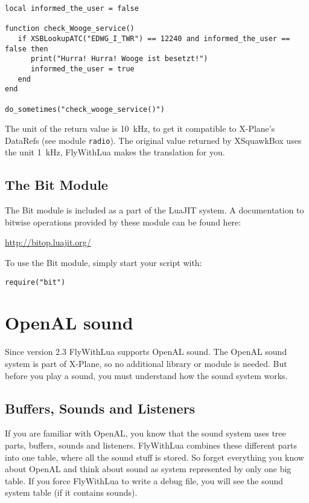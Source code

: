 \documentclass[11pt,parskip=half,a4paper]{scrartcl}
\begin{document}
\begin{lstlisting}
local informed_the_user = false

function check_Wooge_service()
   if XSBLookupATC("EDWG_I_TWR") == 12240 and informed_the_user == false then
      print("Hurra! Hurra! Wooge ist besetzt!")
      informed_the_user = true
   end
end

do_sometimes("check_wooge_service()")
\end{lstlisting}

The unit of the return value is 10~kHz, to get it compatible to X-Plane's DataRefs (see module \verb|radio|). The original value returned by XSquawkBox uses the unit 1~kHz, FlyWithLua makes the translation for you.

\subsection{The Bit Module}

The Bit module is included as a part of the LuaJIT system. A documentation to bitwise operations provided by these module can be found here:

\url{http://bitop.luajit.org/}

To use the Bit module, simply start your script with:

\verb|require("bit")|

\newpage
\section{OpenAL sound}

Since version 2.3 FlyWithLua supports OpenAL sound. The OpenAL sound system is part of X-Plane, so no additional library or module is needed. But before you play a sound, you must understand how the sound system works.

\subsection{Buffers, Sounds and Listeners}

If you are familiar with OpenAL, you know that the sound system uses tree parts, buffers, sounds and listeners. FlyWithLua combines these different parts into one table, where all the sound stuff is stored. So forget everything you know about OpenAL and think about sound as system represented by only one big table. If you force FlyWithLua to write a debug file, you will see the sound system table (if it contains sounds).
\end{document}
